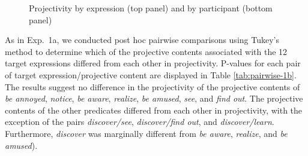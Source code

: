\documentclass[11pt,fleqn]{article}
\newcommand{\6}{\mbox{$[\hspace*{-.6mm}[$}}
\newcommand{\9}{\mbox{$]\hspace*{-.6mm}]$}}
\newcommand{\tableref}[1]{Table \ref{#1}}
\begin{document}
\begin{figure}[!h]
\centering


	
\caption{Projectivity by expression (top panel) and by participant (bottom panel)}\label{fig:f-proj-1b}
\end{figure}

As in Exp.~1a,  we conducted post hoc pairwise comparisons using Tukey's method to determine which of the projective contents associated with the 12 target expressions differed from each other in projectivity. P-values for each pair of target expression/projective content are displayed in \tableref{tab:pairwise-1b}. The results suggest no difference in the projectivity of the projective contents of \emph{be annoyed}, \emph{notice}, \emph{be aware}, \emph{realize}, \emph{be amused}, \emph{see}, and \emph{find out}. The projective contents of the other predicates differed from each other in projectivity, with the exception of the pairs \emph{discover/see}, \emph{discover/find out}, and \emph{discover/learn}. Furthermore, \emph{discover} was  marginally different from \emph{be aware}, \emph{realize}, and \emph{be amused}).
\end{document}
